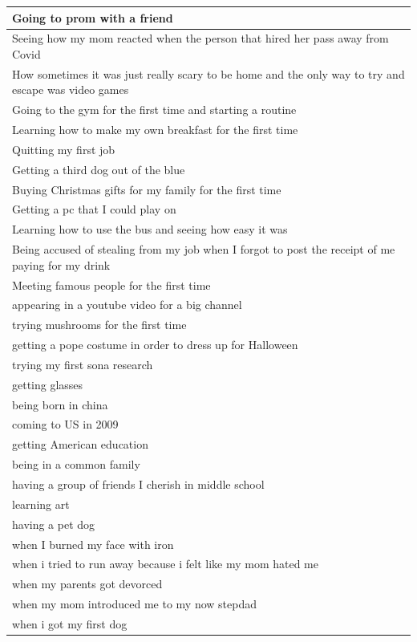 \documentclass[
  .7em,
  letterpaper,
  DIV=11,
  numbers=noendperiod]{scrartcl}
\begin{document}
\begin{table}
\begin{tabular}{l}
Going to prom with a friend\\
\hline
Seeing how my mom reacted when the person that hired her pass away from Covid\\
\hline
How sometimes it was just really scary to be home and the only way to try and escape was video games\\
\hline
Going to the gym for the first time and starting a routine\\
\hline
Learning how to make my own breakfast for the first time\\
\hline
Quitting my first job\\
\hline
Getting a third dog out of the blue\\
\hline
Buying Christmas gifts for my family for the first time\\
\hline
Getting a pc that I could play on\\
\hline
Learning how to use the bus and seeing how easy it was\\
\hline
Being accused of stealing from my job when I forgot to post the receipt of me paying for my drink\\
\hline
Meeting famous people for the first time\\
\hline
appearing in a youtube video for a big channel\\
\hline
trying mushrooms for the first time\\
\hline
getting a pope costume in order to dress up for Halloween\\
\hline
trying my first sona research\\
\hline
getting glasses\\
\hline
being born in china\\
\hline
coming to US in 2009\\
\hline
getting American education\\
\hline
being in a common family\\
\hline
having a group of friends I cherish in middle school\\
\hline
learning art\\
\hline
having a pet dog\\
\hline
when I burned my face with iron\\
\hline
when i tried to run away because i felt like my mom hated me\\
\hline
when my parents got devorced\\
\hline
when my mom introduced me to my now stepdad\\
\hline
when i got my first dog\\

\end{tabular}
\end{table}
\end{document}
